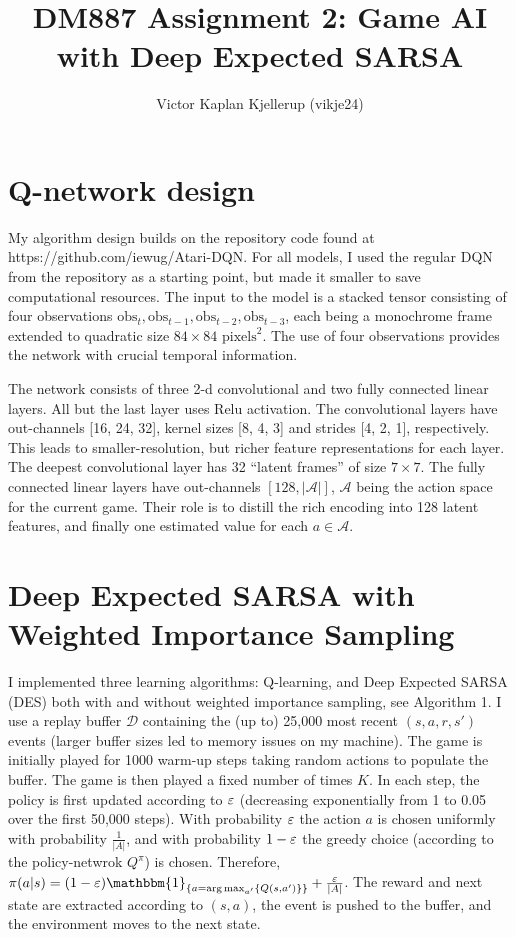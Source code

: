 \documentclass{article}
\begin{document}
\title{DM887 Assignment 2: Game AI with Deep Expected SARSA}
\author{Victor Kaplan Kjellerup (vikje24)}
\date{}  %
\maketitle




\section{Q-network design}
My algorithm design builds on the repository code found at https://github.com/iewug/Atari-DQN. For all models, I used the regular DQN from the repository as a starting point, but made it smaller to save computational resources. The input to the model is a stacked tensor consisting of four observations \(\text{obs}_t, \text{obs}_{t-1}, \text{obs}_{t-2}, \text{obs}_{t-3}\), each being a monochrome frame extended to quadratic size \(84 \times 84\) \(\text{pixels}^2\). The use of four observations provides the network with crucial temporal information.

The network consists of three 2-d convolutional and two fully connected linear layers. All but the last layer uses Relu activation. The convolutional layers have out-channels [16, 24, 32], kernel sizes [8, 4, 3] and strides [4, 2, 1], respectively. This leads to smaller-resolution, but richer feature representations for each layer. The deepest convolutional layer has 32 ``latent frames'' of size \(7 \times 7\). The fully connected linear layers have out-channels \([128, |\mathcal{A}|]\), \(\mathcal{A}\) being the action space for the current game. Their role is to distill the rich encoding into 128 latent features, and finally one estimated value for each \(a \in \mathcal{A}\).

\section{Deep Expected SARSA with Weighted Importance Sampling}
I implemented three learning algorithms: Q-learning, and Deep Expected SARSA (DES) both with and without weighted importance sampling, see Algorithm 1.
I use a replay buffer \(\mathcal{D}\) containing the (up to) 25,000 most recent \((s, a, r, s')\) events (larger buffer sizes led to memory issues on my machine). The game is initially played for 1000 warm-up steps taking random actions to populate the buffer. The game is then played a fixed number of times \(K\). In each step, the policy is first updated according to \(\varepsilon\) (decreasing exponentially from 1 to 0.05 over the first 50,000 steps). With probability \(\varepsilon\) the action \(a\) is chosen uniformly with probability \(\frac{1}{|A|}\), and with probability \(1-\varepsilon\) the greedy choice (according to the policy-netwrok \(Q^\pi\)) is chosen. Therefore, \(\pi(a|s) = (1 - \eps) \mathbbm{1}_{\set{a = \arg\max_{a'}\set{Q(s,a')}}} + \frac{\eps}{|A|}\). The reward and next state are extracted according to \((s,a)\), the event is pushed to the buffer, and the environment moves to the next state.
\end{document}
